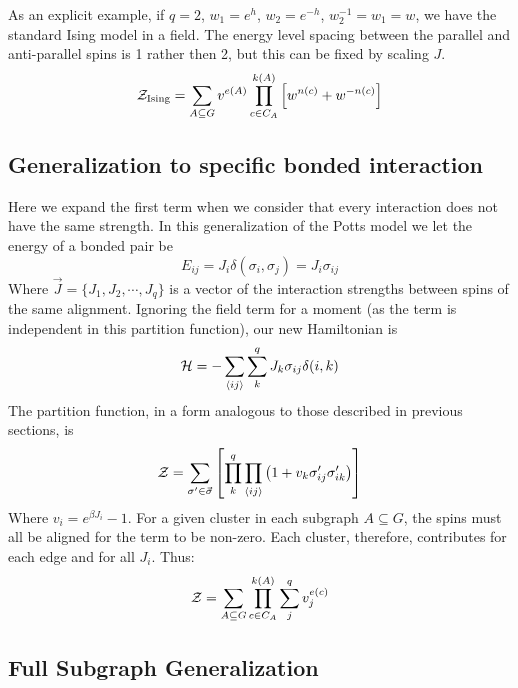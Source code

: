 As an explicit example, if $q=2$, $w_1 = e^{h}$, $w_2 = e^{-h}$, $w^{-1}_2 = w_1 = w$, we have the standard Ising model in a field. The energy level spacing between the parallel and anti-parallel spins is 1 rather then 2, but this can be fixed by scaling $J$.
\begin{align}
\mathcal{Z}_{\text{Ising}} = 
\sum_{A \subseteq G} 
v ^ {e(A)}
\prod_{c\in C_A} ^ {k(A)} \left[  w^{n(c)} + w^{-n(c)}  \right]
\end{align}

\subsection{Generalization to specific bonded interaction}

Here we expand the first term when we consider that every interaction does not have the same strength. In this generalization of the Potts model we let the energy of a bonded pair be
\begin{equation}
E_{ij} = J_i \delta(\sigma_i, \sigma_j) = J_i \sigma_{ij} 
\end{equation}
Where $\vec J = \{J_1, J_2, \cdots, J_q\}$ is a vector of the interaction strengths between spins of the same alignment. Ignoring the field term for a moment (as the term is independent in this partition function), our new Hamiltonian is
\begin{equation}
\mathcal{H} = -\sum_{\left< ij \right>}\sum_{k}^q J_k \sigma_{ij} \delta(i,k)
\end{equation}
The partition function, in a form analogous to those described in previous sections, is
\begin{equation} \mathcal{Z} = \sum_{\sigma ' \in \vec \sigma} 
\left[  
\prod_k^q \prod_{\left< ij \right>} \left(  1 + v_k \sigma '_{ij} \sigma '_{ik}  \right)
 \right]
\end{equation}
Where $v_i = e^{\beta J_i} - 1$. For a given cluster in each subgraph $A \subseteq G$, the spins must all be aligned for the term to be non-zero. Each cluster, therefore, contributes for each edge and for all $J_i$. Thus:
\begin{equation}
\mathcal{Z} = \sum_{A \subseteq G} \prod_{c\in C_A}^{k(A)} \sum_j^q v_j^{e(c)}
\end{equation}

\subsection{Full Subgraph Generalization}

